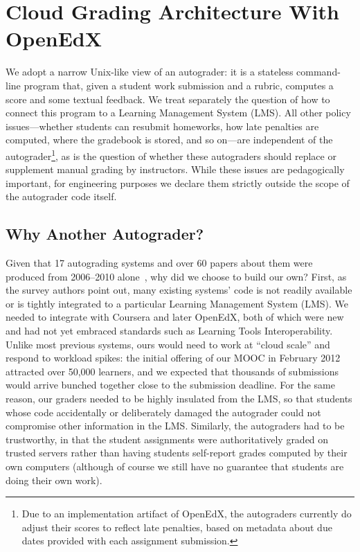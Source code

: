 \section{Cloud Grading Architecture With OpenEdX}
\label{sec:arch}

We adopt a narrow Unix-like view of an autograder: it is a
stateless command-line program that, given a student work submission and
a rubric, computes a score and some textual feedback.  We treat
separately the question of how to connect this program to a Learning
Management System (LMS).
All other policy issues---whether students can resubmit homeworks, how
late penalties are computed, where the gradebook is stored, and so 
on---are independent of the autograder\footnote{Due to an implementation
  artifact of OpenEdX, the autograders currently do adjust their scores
  to reflect late penalties, based on metadata about due dates provided
  with each assignment submission.}, as is the question of whether these
autograders should replace or supplement manual grading by instructors.
While these issues are pedagogically important, for engineering purposes
we declare them strictly outside the scope of the autograder code itself.

\subsection{Why Another Autograder?}

Given that 17 autograding systems and over 60 papers about them were
produced from 2006--2010 alone~\cite{ihantola-2010-autograding-survey},
why did we choose to build our own?
First, as the survey authors point
out, many existing systems' code
is not readily available or is tightly integrated to a particular Learning
Management System (LMS).  We needed to integrate with Coursera and
later OpenEdX, both of which were new and had not yet embraced
standards such as Learning Tools Interoperability.
Unlike most previous 
systems, ours would need to work at ``cloud scale'' and respond to
workload spikes: the initial
offering of our MOOC in February 2012  
attracted over 50,000 learners, and we expected
that thousands of submissions would arrive bunched together close to the
submission deadline.  For the same reason, our graders needed to be
highly insulated from the LMS, so that students whose code accidentally
or deliberately damaged the autograder could not compromise other
information in the LMS.
Similarly, 
the autograders had to be trustworthy, in that the student
assignments were authoritatively graded on trusted servers rather than
having students self-report grades computed by their own computers
(although of course we still have no guarantee that students are doing
their own work).


